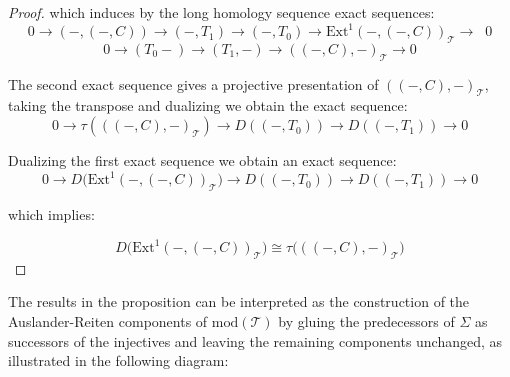 \documentclass{amsart}
\theoremstyle{plain}
\numberwithin{equation}{section}
\begin{document}
\begin{proof}
which induces by the long homology sequence exact sequences:\begin{equation*}
0\rightarrow (-,(-,C))\rightarrow (-,T_{1})\rightarrow (-,T_{0})\rightarrow
\mathrm{Ext}^{1}(-,(-,C))_\mathcal{T}\rightarrow \;\;\text{0}
\end{equation*}\begin{equation*}
0\rightarrow (T_{0}-)\rightarrow (T_{1},-)\rightarrow ((-,C),-)_\mathcal{T}\rightarrow 0
\end{equation*}

The second exact sequence gives a projective presentation of $((-,C),-)_\mathcal{T}$, taking the transpose and dualizing we obtain the exact
sequence:\begin{equation*}
0\rightarrow \tau (((-,C),-)_{\mathcal{T}})\rightarrow
D((-,T_{0}))\rightarrow D((-,T_{1}))\rightarrow 0
\end{equation*}

Dualizing the first exact sequence we obtain an exact sequence:\begin{equation*}
0\rightarrow D(\mathrm{Ext}^{1}(-,(-,C))_{\mathcal{T}}\mathcal{)}\rightarrow
D((-,T_{0}))\rightarrow D((-,T_{1}))\rightarrow 0
\end{equation*}

which implies:

\begin{equation*}
D(\mathrm{Ext}^{1}(-,(-,C))_{\mathcal{T}}\mathcal{)}\cong \tau (((-,C),-)_{\mathcal{T}}\mathcal{)}
\end{equation*}
\end{proof}

The results in the proposition can be interpreted as the construction of the
Auslander-Reiten components of $\mathrm{mod}(\mathcal{T})$ by gluing the
predecessors of $\Sigma $ as successors of the injectives and leaving the
remaining components unchanged, as illustrated in the following diagram:
\end{document}
